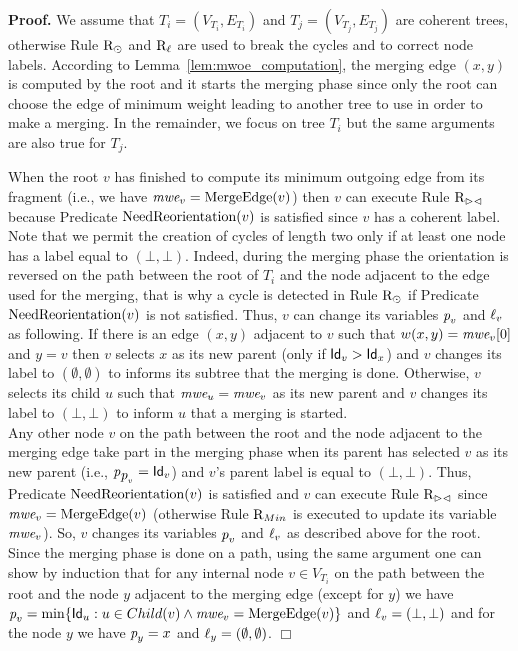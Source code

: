 \documentclass[11pt,a4paper]{article}
\newenvironment{proof}{\noindent \begin{rm}{\textbf{Proof.} }}{\hspace*{\fill}$\Box$\par\end{rm}}
\newcommand{\id}{\mbox{\sf Id}}
\newcommand{\parent}{\mbox{\it p}}
\newcommand{\lab}{\mbox{\rm $\ell$}}
\newcommand{\m}{\mbox{\it mwe}}
\newcommand{\NeedReorientation}{\mbox{\rm NeedReorientation}}
\newcommand{\Fusion}{\mbox{\rm MergeEdge}}
\newcommand{\RRoot}{\mbox{\rm R$_{\odot}$}} 	\newcommand{\RRLC}{\mbox{\rm R$_{\ell_{\odot}}$}}\newcommand{\RLC}{\mbox{\rm R$_{\ell}$}} \newcommand{\RMin}{\mbox{\rm R$_{Min}$}}
\newcommand{\RF}{\mbox{\rm R$_{\vartriangleright \vartriangleleft}$}}
\begin{document}
\begin{proof}
We assume that $T_i=(V_{T_i},E_{T_i})$ and $T_j=(V_{T_j},E_{T_j})$ are coherent trees, otherwise Rule $\RRoot$ and $\RLC$ are used to break the cycles and to correct node labels. According to Lemma~\ref{lem:mwoe_computation}, the merging edge $(x,y)$ is computed by the root and it starts the merging phase since only the root can choose the edge of minimum weight leading to another tree to use in order to make a merging. In the remainder, we focus on tree $T_i$ but the same arguments are also true for $T_j$.

When the root $v$ has finished to compute its minimum outgoing edge from its fragment (i.e., we have $\m_v=\Fusion(v)$) then $v$ can execute Rule $\RF$ because Predicate $\NeedReorientation(v)$ is satisfied since $v$ has a coherent label. Note that we permit the creation of cycles of length two only if at least one node has a label equal to $(\bot,\bot)$. Indeed, during the merging phase the orientation is reversed on the path between the root of $T_i$ and the node adjacent to the edge used for the merging, that is why a cycle is detected in Rule $\RRoot$ if Predicate $\NeedReorientation(v)$ is not satisfied. Thus, $v$ can change its variables $\parent_v$ and $\lab_v$ as following. If there is an edge $(x,y)$ adjacent to $v$ such that $w(x,y)=\m_v[0]$ and $y=v$ then $v$ selects $x$ as its new parent (only if $\id_v>\id_x$) and $v$ changes its label to $(\emptyset,\emptyset)$ to informs its subtree that the merging is done. Otherwise, $v$ selects its child $u$ such that $\m_u=\m_v$ as its new parent and $v$ changes its label to $(\bot,\bot)$ to inform $u$ that a merging is started.\\
Any other node $v$ on the path between the root and the node adjacent to the merging edge take part in the merging phase when its parent has selected $v$ as its new parent (i.e., $\parent_{\parent_v}=\id_v$) and $v$'s parent label is equal to $(\bot,\bot)$. Thus, Predicate $\NeedReorientation(v)$ is satisfied and $v$ can execute Rule $\RF$ since $\m_v=\Fusion(v)$ (otherwise Rule $\RMin$ is executed to update its variable $\m_v$). So, $v$ changes its variables $\parent_v$ and $\lab_v$ as described above for the root. Since the merging phase is done on a path, using the same argument one can show by induction that for any internal node $v \in V_{T_i}$ on the path between the root and the node $y$ adjacent to the merging edge (except for $y$) we have $\parent_v=\min\{\id_u: u \in Child(v) \wedge \m_v=\Fusion(v)\}$ and $\lab_v=(\bot,\bot)$ and for the node $y$ we have $\parent_y=x$ and $\lab_y=(\emptyset,\emptyset)$.
\end{proof}
\end{document}
